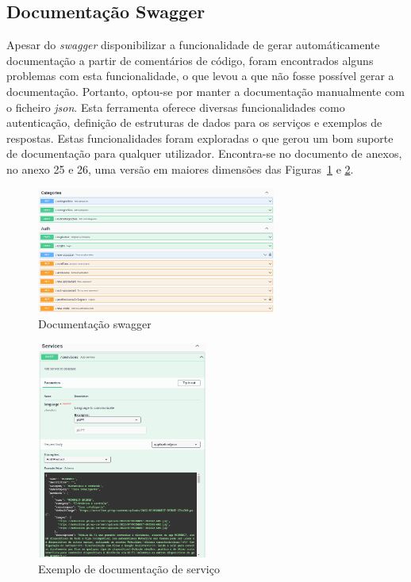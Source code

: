 \newpage

\subsection{Documentação Swagger}
Apesar do \textit{swagger} disponibilizar a funcionalidade de gerar automáticamente documentação a partir de comentários de código, foram encontrados alguns problemas com esta funcionalidade, o que levou a que não fosse possível gerar a documentação. Portanto, optou-se por manter a documentação manualmente com o ficheiro \textit{\acrshort{json}}. Esta ferramenta oferece diversas funcionalidades como autenticação, definição de estruturas de dados para os serviços e exemplos de respostas. Estas funcionalidades foram exploradas o que gerou um bom suporte de documentação para qualquer utilizador.
Encontra-se no documento de anexos, no anexo 25 e 26, uma versão em maiores dimensões das Figuras~\ref*{fig:67} e \ref*{fig:68}.
\begin{figure}[htb]
 \centering
 \includegraphics[width=0.7\textwidth]{images/implementacao/api/swagger_intro.png}
 \caption{Documentação swagger}
 \label{fig:67}
\end{figure}

\begin{figure}[htb]
 \centering
 \includegraphics[width=0.5\textwidth]{images/implementacao/api/swagger_pedido.png}
 \caption{Exemplo de documentação de serviço}
 \label{fig:68}
\end{figure}
